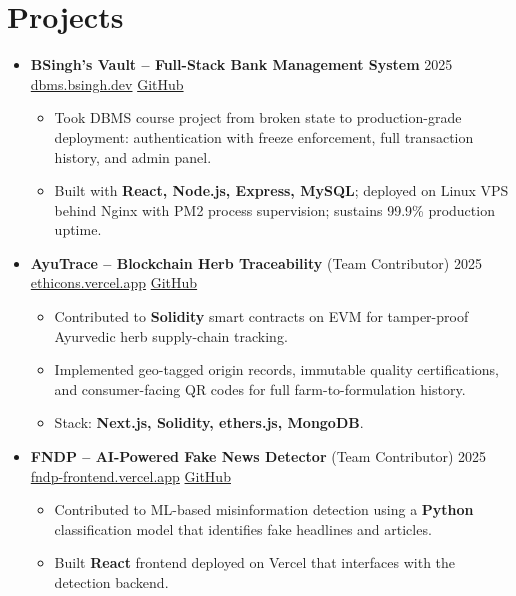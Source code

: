 \documentclass[11pt,letterpaper]{article}
\begin{document}
\section*{Projects}
\begin{itemize}
\item \textbf{BSingh's Vault -- Full-Stack Bank Management System} \hfill 2025 \\
\href{https://dbms.bsingh.dev}{dbms.bsingh.dev} \textbar{} \href{https://github.com/BSinghOP/bank-management-system}{GitHub}
\begin{itemize}
\item Took DBMS course project from broken state to production-grade deployment: authentication with freeze enforcement, full transaction history, and admin panel.
\item Built with \textbf{React, Node.js, Express, MySQL}; deployed on Linux VPS behind Nginx with PM2 process supervision; sustains 99.9\% production uptime.
\end{itemize}

\item \textbf{AyuTrace -- Blockchain Herb Traceability} (Team Contributor) \hfill 2025 \\
\href{https://ethicons.vercel.app}{ethicons.vercel.app} \textbar{} \href{https://github.com/BSinghOP/ethicons-ayutrace}{GitHub}
\begin{itemize}
\item Contributed to \textbf{Solidity} smart contracts on EVM for tamper-proof Ayurvedic herb supply-chain tracking.
\item Implemented geo-tagged origin records, immutable quality certifications, and consumer-facing QR codes for full farm-to-formulation history.
\item Stack: \textbf{Next.js, Solidity, ethers.js, MongoDB}.
\end{itemize}

\item \textbf{FNDP -- AI-Powered Fake News Detector} (Team Contributor) \hfill 2025 \\
\href{https://fndp-frontend.vercel.app}{fndp-frontend.vercel.app} \textbar{} \href{https://github.com/Nikunjmiglani/FNDP---Fake-new-detector-project}{GitHub}
\begin{itemize}
\item Contributed to ML-based misinformation detection using a \textbf{Python} classification model that identifies fake headlines and articles.
\item Built \textbf{React} frontend deployed on Vercel that interfaces with the detection backend.
\end{itemize}
\end{itemize}
\end{document}
